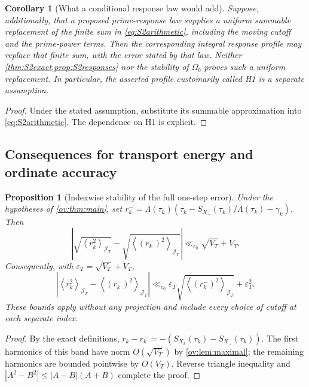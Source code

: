 \documentclass[11pt,reqno]{amsart}
\numberwithin{equation}{section}
\newtheorem{proposition}[theorem]{Proposition}
\newtheorem{corollary}[theorem]{Corollary}
\newcommand{\lamb}{\Lambda}
\newcommand{\avgJ}[1]{\left\langle #1\right\rangle_{\mathcal J_T}}
\begin{document}
\begin{corollary}[What a conditional response law would add]\label{cor:S2conditional}
Suppose, additionally, that a proposed prime-response law supplies a
uniform summable replacement of the finite sum in
\eqref{eq:S2arithmetic}, including the moving cutoff and the
prime-power terms. Then the corresponding integral response profile
may replace that finite sum, with the error stated by that law.
Neither \cref{thm:S2exact,prop:S2responses} nor the stability of
$\Omega_b$ proves such a uniform replacement. In particular, the
asserted profile customarily called H1 is a separate assumption.
\end{corollary}
\begin{proof}
Under the stated assumption, substitute its summable approximation
into \eqref{eq:S2arithmetic}. The dependence on H1 is explicit.
\end{proof}


\subsection{Consequences for transport energy and ordinate accuracy}
\begin{proposition}[Indexwise stability of the full one-step error]\label{prop:indexfull}
Under the hypotheses of \cref{ov:thm:main}, set
$r_k^-=\lamb(\tau_k)(\tau_k-S_{X_-}(\tau_k)/\lamb(\tau_k)-\gamma_k)$.
Then
\begin{equation}\label{eq:indexfull}
\left|\sqrt{\avgJ{r_k^2}}-\sqrt{\avgJ{(r_k^-)^2}}\right|
\ll_{c_0}\sqrt{V_T}+V_T.
\end{equation}
Consequently, with $\varepsilon_T=\sqrt{V_T}+V_T$,
\begin{equation}\label{eq:indexenergy}
\left|\avgJ{r_k^2}-\avgJ{(r_k^-)^2}\right|
\ll_{c_0}\varepsilon_T\sqrt{\avgJ{(r_k^-)^2}}+\varepsilon_T^2.
\end{equation}
These bounds apply without any projection and include every choice of
cutoff at each separate index.
\end{proposition}
\begin{proof}
By the exact definitions,
$r_k-r_k^-=-(S_{X_k}(\tau_k)-S_{X_-}(\tau_k))$.
The first harmonics of this band have norm
$O(\sqrt{V_T})$ by \cref{ov:lem:maximal}; the remaining harmonics
are bounded pointwise by $O(V_T)$. Reverse triangle inequality and
$|A^2-B^2|\le|A-B|(A+B)$ complete the proof.
\end{proof}
\end{document}
